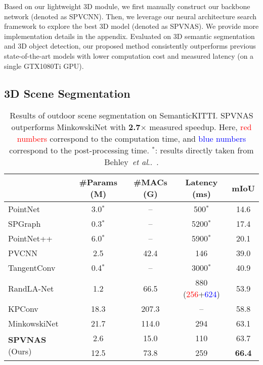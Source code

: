\documentclass[runningheads]{llncs}
\makeatletter
\DeclareRobustCommand\onedot{\futurelet\@let@token\@onedot}
\def\@onedot{\ifx\@let@token.\else.\null\fi\xspace}
\def\etal{\emph{et al}\onedot}
\def\cnnshort{SPVCNN\xspace}
\def\modelshort{SPVNAS\xspace}
\makeatother
\begin{document}
Based on our lightweight 3D module, we first manually construct our backbone network (denoted as \cnnshort). Then, we leverage our neural architecture search framework to explore the best 3D model (denoted as \modelshort). We provide more implementation details in the appendix. Evaluated on 3D semantic segmentation and 3D object detection, our proposed method consistently outperforms previous state-of-the-art models with lower computation cost and measured latency (on a single GTX1080Ti GPU).

\subsection{3D Scene Segmentation}

\begin{table}[t]
\setlength{\tabcolsep}{8pt}
\small\centering
\begin{tabular}{lcccc}
    \toprule
     & \#Params (M) & \#MACs (G) & Latency (ms) & mIoU \\
    \midrule
    PointNet~\cite{qi2017pointnet} & 3.0$^{*}$ & -- & 500$^{*}$ & 14.6 \\
    SPGraph~\cite{landrieu2018large} & 0.3$^{*}$ & -- & 5200$^{*}$ & 17.4 \\
    PointNet++~\cite{qi2017pointnet++} & 6.0$^{*}$ & -- & 5900$^{*}$ & 20.1 \\
    PVCNN~\cite{liu2019point} & 2.5 & 42.4 & 146 & 39.0 \\
    TangentConv~\cite{tatarchenko2018tangent} & 0.4$^{*}$ & -- & 3000$^{*}$ & 40.9 \\
    RandLA-Net~\cite{hu2019randla} & 1.2 & 66.5 & 880 (\textcolor{red}{256}+\textcolor{blue}{624}) & 53.9 \\
    KPConv~\cite{thomas2019kpconv} & 18.3 & 207.3 & -- & 58.8 \\
    MinkowskiNet~\cite{choy20194d} & 21.7 & 114.0 & 294 & 63.1 \\
    \midrule
    \multirow{2}{*}{\textbf{\modelshort} (Ours)} & 2.6 & 15.0 & 110 & 63.7 \\
     & 12.5 & 73.8 & 259 & \textbf{66.4} \\
    \bottomrule
\end{tabular}
\caption{Results of outdoor scene segmentation on SemanticKITTI. \modelshort outperforms MinkowskiNet with \textbf{2.7}$\times$ measured speedup. Here, \textcolor{red}{red numbers} correspond to the computation time, and \textcolor{blue}{blue numbers} correspond to the post-processing time. $^{*}$: results directly taken from Behley~\etal~\cite{behley2019semantickitti}.}
\label{tab:semantickitti:results:3d}
\end{table}
\end{document}
